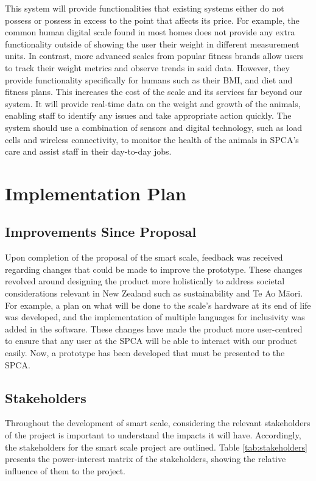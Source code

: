This system will provide functionalities that existing systems either do not possess or possess in excess to the point that affects its price. For example, the common human digital scale found in most homes does not provide any extra functionality outside of showing the user their weight in different measurement units. In contrast, more advanced scales from popular fitness brands allow users to track their weight metrics and observe trends in said data. However, they provide functionality specifically for humans such as their BMI, and diet and fitness plans. This increases the cost of the scale and its services far beyond our system. It will provide real-time data on the weight and growth of the animals, enabling staff to identify any issues and take appropriate action quickly. The system should use a combination of sensors and digital technology, such as load cells and wireless connectivity, to monitor the health of the animals in SPCA’s care and assist staff in their day-to-day jobs.


\chapter{Implementation Plan}

\section{Improvements Since Proposal}

Upon completion of the proposal of the smart scale, feedback was received regarding changes that could be made to improve the prototype. These changes revolved around designing the product more holistically to address societal considerations relevant in New Zealand such as sustainability and Te Ao Māori. For example, a plan on what will be done to the scale’s hardware at its end of life was developed, and the implementation of multiple languages for inclusivity was added in the software. These changes have made the product more user-centred to ensure that any user at the SPCA will be able to interact with our product easily. Now, a prototype has been developed that must be presented to the SPCA.

\section{Stakeholders}

Throughout the development of smart scale, considering the relevant stakeholders of the project is important to understand the impacts it will have. Accordingly, the stakeholders for the smart scale project are outlined. Table \ref{tab:stakeholders} presents the power-interest matrix of the stakeholders, showing the relative influence of them to the project.


